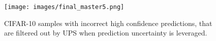 \documentclass{article} \usepackage{iclr2021_conference,times}
\begin{document}
\begin{figure}\centering
   
  \texttt{[image: images/final\_master5.png]}
    \caption{CIFAR-10 samples with incorrect high confidence predictions, that are filtered out by UPS when prediction uncertainty is leveraged. }
    \label{fig:qualitative}\end{figure}
\end{document}
